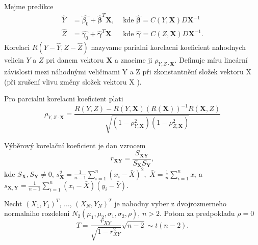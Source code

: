 \begin{definition}
Mejme predikce
\begin{align*}
\hat{Y} &= \hat{\beta_0} + \bm{\hat{\beta}}^T \mathbf{X}, & \text{ kde } \bm{\hat{\beta}} =  C(Y, \mathbf{X}) D \mathbf{X}^{-1}\\
\hat{Z} &= \hat{\gamma_0} + \bm{\hat{\gamma}}^T \mathbf{X} & \text{ kde } \bm{\hat{\gamma}} =  C(Z, \mathbf{X}) D \mathbf{X}^{-1}.
\end{align*}
Korelaci $R(Y - \hat{Y}, Z - \hat{Z})$ nazyvame parialni korelacni koeficient nahodnych velicin $Y$ a $Z$ pri danem vektoru $\mathbf{X}$ a znacime ji $\rho_{Y, Z \cdot \mathbf{X}}$. Definuje míru lineární závislosti mezi náhodnými veličinami Y a Z při zkonstantnění složek vektoru X (při zrušení vlivu změny složek vektoru X ).
\end{definition} 

\begin{theorem}
Pro parcialni korelacni koeficient plati
\begin{equation*}
\rho_{Y, Z \cdot \mathbf{X}} = \frac{R(Y, Z) - R(Y, \mathbf{X}) (R(\mathbf{X}))^{-1} R(\mathbf{X}, Z)}{\sqrt{(1 - \rho_{Y, \mathbf{X}}^2)(1 - \rho_{Z, \mathbf{X}}^2)}}
\end{equation*}
\end{theorem}

\begin{definition}
Výběrový korelační koeficient je dan vzrocem
$$r _{\pmb{X} \pmb{Y}} = \frac{S_{\pmb{X} \pmb{Y}}}{S_{\mathbf{X}} S_{\mathbf{Y}}},$$ kde $S_{\mathbf{X}}, S_{\mathbf{Y}} \neq 0$, $s_{\pmb{X}}^2 = \frac{1}{n-1} \sum_{i=1}^{n} \left(x_i - \bar{X} \right)^2,$ $\bar{X} = \frac{1}{n} \sum_{i=1}^{n} x_i$ a $s_{\pmb{X},\pmb{Y}} = \frac{1}{n-1} \sum_{i=1}^{n} \left(x_i - \bar{X} \right)\left(y_i - \bar{Y} \right)$.
\end{definition}

\begin{theorem}
Necht $(X_1, Y_1)^T$, $\ldots$, $(X_N, Y_N)^T$ je nahodny vyber z dvojrozmerneho normalniho rozdeleni $N_2 (\mu_1, \mu_2, \sigma_1, \sigma_2, \rho)$, $n >2$. Potom za predpokladu $\rho = 0$ 
\begin{equation*}
T = \frac{r_{X Y}}{\sqrt{1 - r_{XY}^2}} \sqrt{n - 2} \sim t(n - 2).
\end{equation*}
\end{theorem}

